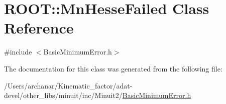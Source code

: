 \hypertarget{classROOT_1_1Minuit2_1_1BasicMinimumError_1_1MnHesseFailed}{}\section{R\+O\+OT\+:\+:Mn\+Hesse\+Failed Class Reference}
\label{classROOT_1_1Minuit2_1_1BasicMinimumError_1_1MnHesseFailed}


{\ttfamily \#include $<$Basic\+Minimum\+Error.\+h$>$}



The documentation for this class was generated from the following file\+:\begin{DoxyCompactItemize}
\item 
/\+Users/archanar/\+Kinematic\+\_\+factor/adat-\/devel/other\+\_\+libs/minuit/inc/\+Minuit2/\mbox{\hyperlink{adat-devel_2other__libs_2minuit_2inc_2Minuit2_2BasicMinimumError_8h}{Basic\+Minimum\+Error.\+h}}\end{DoxyCompactItemize}
